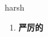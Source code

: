 
\begin{frame}
{\huge harsh}
\begin{center}
\begin{enumerate}\Large
  \item \textbf{严厉的}
\end{enumerate}
\end{center}
\end{frame}
